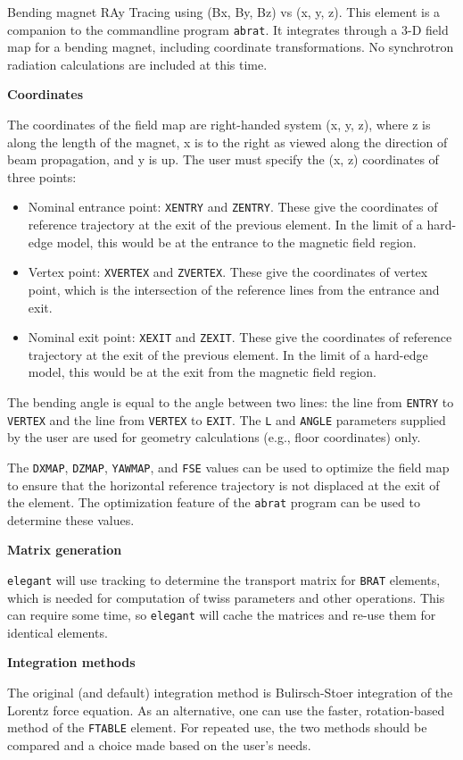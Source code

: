 Bending magnet RAy Tracing using (Bx, By, Bz) vs (x, y, z).
This element is a companion to the commandline program {\tt abrat}.
It integrates through a 3-D field map for a bending magnet, including
coordinate transformations.
No synchrotron radiation calculations are included at this time.

{\bf Coordinates}

The coordinates of the field map are right-handed system (x, y, z), where z is along the length of the magnet, x is 
to the right as viewed along the direction of beam propagation, and y is up.
The user must specify the (x, z) coordinates of three points:
\begin{itemize}
\item Nominal entrance point: \verb|XENTRY| and \verb|ZENTRY|. These give the coordinates of reference trajectory at
  the exit of the previous element. In the limit of a hard-edge model, this would be at the entrance to the magnetic field 
  region.
\item Vertex point: \verb|XVERTEX| and \verb|ZVERTEX|. These give the coordinates of vertex point, which is the intersection
  of the reference lines from the entrance and exit.
\item Nominal exit point: \verb|XEXIT| and \verb|ZEXIT|. These give the coordinates of reference trajectory at
  the exit of the previous element. In the limit of a hard-edge model, this would be at the exit from the magnetic field 
  region.
\end{itemize}
The bending angle is equal to the angle between two lines: the line from \verb|ENTRY| to \verb|VERTEX| and the
line from \verb|VERTEX| to \verb|EXIT|.
The \verb|L| and \verb|ANGLE| parameters supplied by the user are used for geometry calculations (e.g., floor coordinates) only.

The \verb|DXMAP|, \verb|DZMAP|, \verb|YAWMAP|, and \verb|FSE| values can be used to optimize the field map to ensure that
the horizontal reference trajectory is not displaced at the exit of the element.
The optimization feature of the \verb|abrat| program can be used to determine these values.

{\bf Matrix generation}

{\tt elegant} will use tracking to determine the transport matrix for \verb|BRAT| elements, which 
is needed for computation of twiss parameters and other operations.
This can require some time, so {\tt elegant} will cache the matrices and re-use them for
identical elements.

{\bf Integration methods}

The original (and default) integration method is Bulirsch-Stoer integration of the Lorentz force equation.
As an alternative, one can use the faster, rotation-based method of the \verb|FTABLE| element.
For repeated use, the two methods should be compared and a choice made based on the user's needs.
